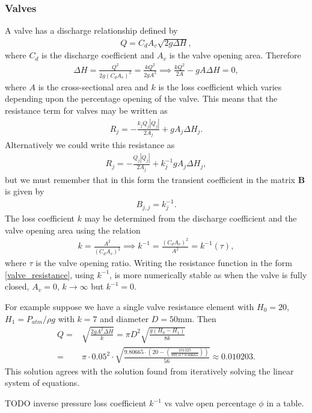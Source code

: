 \subsubsection{Valves}

A valve has a discharge relationship defined by 
\begin{align}
Q = C_d A_v \sqrt{2 g \Delta H},
\end{align}
where $C_d$ is the discharge coefficient and $A_v$ is the valve opening area. Therefore 
\begin{align}
\Delta H = \frac{Q^2}{2g\left(C_d A_v \right)^2} = \frac{k Q^2}{2 g A^2} \implies \frac{k Q^2}{2A} - g A \Delta H = 0,
\end{align}
where $A$ is the cross-sectional area and $k$ is the loss coefficient which varies depending upon the percentage opening of the valve. This means that the resistance term for valves may be written as
\begin{align}
R_j = - \frac{k_j Q_j|Q_j| }{2 A_j} + g A_j \Delta H_j.
\end{align}
Alternatively we could write this resistance as 
\begin{align} \label{valve_resistance}
    \boxed{ R_j = - \frac{Q_j|Q_j| }{2 A_j} + k_j^{-1} g A_j \Delta H_j, }
\end{align}
but we must remember that in this form the transient coefficient in the matrix $\mathbf{B}$ is given by
\begin{align}
    \boxed{ B_{j,j} = k_j^{-1}. }
\end{align}
The loss coefficient $k$ may be determined from the discharge coefficient and the valve opening area using the relation 
\begin{align}
k = \frac{A^2}{\left(C_d A_v \right)^2} \implies k^{-1} = \frac{\left(C_d A_v \right)^2}{A^2} = k^{-1}(\tau),
\end{align}
where $\tau$ is the valve opening ratio. Writing the resistance function in the form \eqref{valve_resistance}, using $k^{-1}$, is more numerically stable as when the valve is fully closed, $A_v = 0$, $k \to \infty$ but $k^{-1} = 0$.

For example suppose we have a single valve resistance element with $H_0 = 20$, $H_1 = P_{atm} / \rho g$ with $k = 7$ and diameter $D = 50$mm. Then 
\begin{align}
Q =& \sqrt{\frac{2gA^2 \Delta H}{k}} = \pi D^2 \sqrt{\frac{g \left(H_0 - H_1 \right)}{8k}} \nonumber \\ =& \pi \cdot 0.05^2 \cdot \sqrt{\frac{9.80665 \cdot \left(20 - \left( \frac{101325}{ 997.0 * 9.80665} \right) \right)}{56}} \approx 0.010203.
\end{align} 
This solution agrees with the solution found from iteratively solving the linear system of equations. 

{\color{red} TODO inverse pressure loss coefficient $k^{-1}$ vs valve open percentage $\phi$ in a table.}

